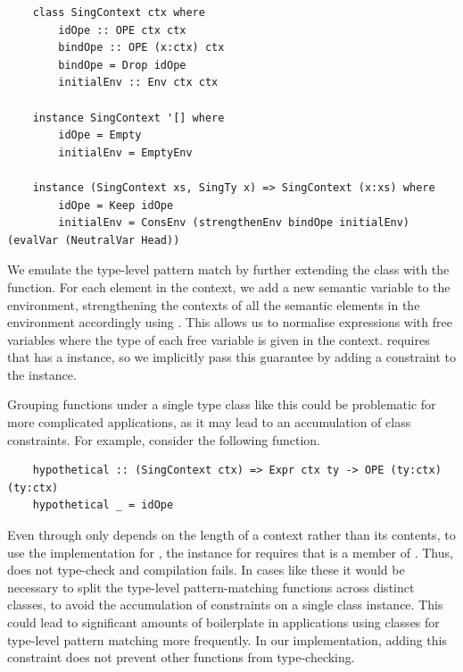 \begin{lstlisting}
    class SingContext ctx where
        idOpe :: OPE ctx ctx
        bindOpe :: OPE (x:ctx) ctx
        bindOpe = Drop idOpe
        initialEnv :: Env ctx ctx

    instance SingContext '[] where
        idOpe = Empty
        initialEnv = EmptyEnv

    instance (SingContext xs, SingTy x) => SingContext (x:xs) where
        idOpe = Keep idOpe
        initialEnv = ConsEnv (strengthenEnv bindOpe initialEnv) (evalVar (NeutralVar Head))
\end{lstlisting}

We emulate the type-level pattern match by further extending the  class with the  function. 
For each element in the context, we add a new semantic variable to the environment, strengthening the contexts of all the semantic elements in the environment accordingly using . This allows us to normalise expressions with free variables where the type of each free variable is given in the context.  requires that  has a  instance, so we implicitly pass this guarantee by adding a  constraint to the instance. 

Grouping functions under a single type class like this could be problematic for more complicated applications, as it may lead to an accumulation of class constraints. For example, consider the following  function.

\begin{lstlisting}
    hypothetical :: (SingContext ctx) => Expr ctx ty -> OPE (ty:ctx) (ty:ctx)
    hypothetical _ = idOpe
\end{lstlisting}

Even through  only depends on the length of a context rather than its contents, to use the  implementation for , the \code{(:)} instance for  requires that  is a member of . Thus,  does not type-check and compilation fails. In cases like these it would be necessary to split the type-level pattern-matching functions across distinct classes, to avoid the accumulation of constraints on a single class instance. This could lead to significant amounts of boilerplate in applications using classes for type-level pattern matching more frequently. In our implementation, adding this constraint does not prevent other functions from type-checking. 

